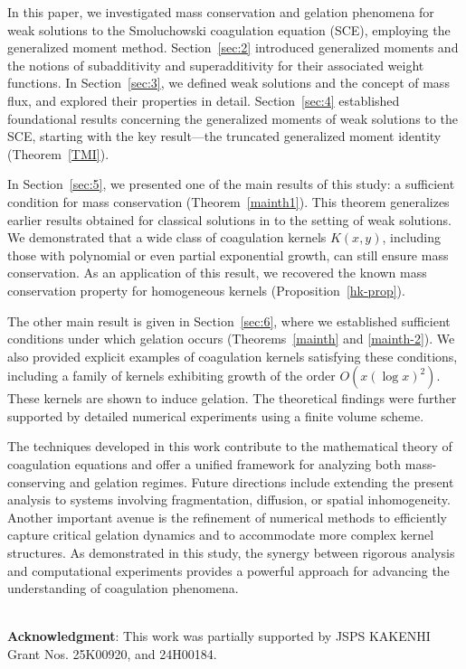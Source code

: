 \documentclass[a4paper,11pt]{article}
\begin{document}
In this paper, we investigated mass conservation and gelation phenomena for weak solutions to the Smoluchowski coagulation equation (SCE), employing the generalized moment method. Section~\ref{sec:2} introduced generalized moments and the notions of subadditivity and superadditivity for their associated weight functions. In Section~\ref{sec:3}, we defined weak solutions and the concept of mass flux, and explored their properties in detail. Section~\ref{sec:4} established foundational results concerning the generalized moments of weak solutions to the SCE, starting with the key result—the truncated generalized moment identity (Theorem~\ref{TMI}).

In Section~\ref{sec:5}, we presented one of the main results of this study: a sufficient condition for mass conservation (Theorem~\ref{mainth1}). This theorem generalizes earlier results obtained for classical solutions in \cite{I-K-M2023} to the setting of weak solutions. We demonstrated that a wide class of coagulation kernels \( K(x,y) \), including those with polynomial or even partial exponential growth, can still ensure mass conservation. As an application of this result, we recovered the known mass conservation property for homogeneous kernels (Proposition~\ref{hk-prop}).

The other main result is given in Section~\ref{sec:6}, where we established sufficient conditions under which gelation occurs (Theorems~\ref{mainth} and \ref{mainth-2}). We also provided explicit examples of coagulation kernels satisfying these conditions, including a family of kernels exhibiting growth of the order \( O(x(\log x)^2) \). These kernels are shown to induce gelation. The theoretical findings were further supported by detailed numerical experiments using a finite volume scheme.

The techniques developed in this work contribute to the mathematical theory of coagulation equations and offer a unified framework for analyzing both mass-conserving and gelation regimes. Future directions include extending the present analysis to systems involving fragmentation, diffusion, or spatial inhomogeneity. Another important avenue is the refinement of numerical methods to efficiently capture critical gelation dynamics and to accommodate more complex kernel structures. As demonstrated in this study, the synergy between rigorous analysis and computational experiments provides a powerful approach for advancing the understanding of coagulation phenomena.

~\\\noindent
{\bf Acknowledgment}:
This work was partially supported by JSPS KAKENHI Grant Nos. 25K00920, and 24H00184. 
\end{document}
